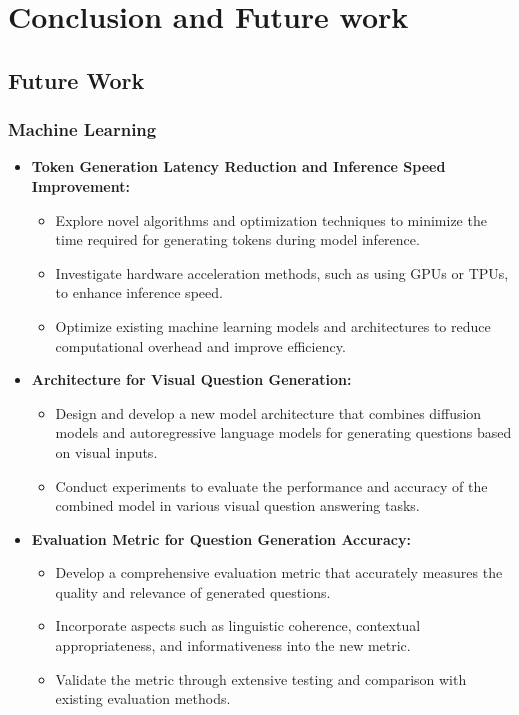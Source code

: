 \chapter{Conclusion and Future work}

\section{Future Work}

\subsection{Machine Learning}
\begin{itemize}
    \item \textbf{Token Generation Latency Reduction and Inference Speed Improvement:}
    \begin{itemize}
        \item Explore novel algorithms and optimization techniques to minimize the time required for generating tokens during model inference.
        \item Investigate hardware acceleration methods, such as using GPUs or TPUs, to enhance inference speed.
        \item Optimize existing machine learning models and architectures to reduce computational overhead and improve efficiency.
    \end{itemize}
    
    \item \textbf{Architecture for Visual Question Generation:}
    \begin{itemize}
        \item Design and develop a new model architecture that combines diffusion models and autoregressive language models for generating questions based on visual inputs.
        \item Conduct experiments to evaluate the performance and accuracy of the combined model in various visual question answering tasks.
    \end{itemize}
    
    \item \textbf{Evaluation Metric for Question Generation Accuracy:}
    \begin{itemize}
        \item Develop a comprehensive evaluation metric that accurately measures the quality and relevance of generated questions.
        \item Incorporate aspects such as linguistic coherence, contextual appropriateness, and informativeness into the new metric.
        \item Validate the metric through extensive testing and comparison with existing evaluation methods.
    \end{itemize}
    

\end{itemize}
